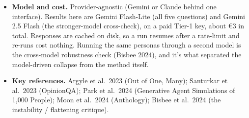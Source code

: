 \documentclass[11pt]{article}
\begin{document}
\begin{itemize}
  \item \textbf{Model and cost.} Provider-agnostic (Gemini or Claude behind one interface). Results here are Gemini Flash-Lite (all five questions) and Gemini 2.5 Flash (the stronger-model cross-check), on a paid Tier-1 key, about €3 in total. Responses are cached on disk, so a run resumes after a rate-limit and re-runs cost nothing. Running the same personas through a second model is the cross-model robustness check (Bisbee 2024), and it's what separated the model-driven collapse from the method itself.
  \item \textbf{Key references.} Argyle et al.\ 2023 (Out of One, Many); Santurkar et al.\ 2023 (OpinionQA); Park et al.\ 2024 (Generative Agent Simulations of 1,000 People); Moon et al.\ 2024 (Anthology); Bisbee et al.\ 2024 (the instability / flattening critique).
\end{itemize}
\end{document}
